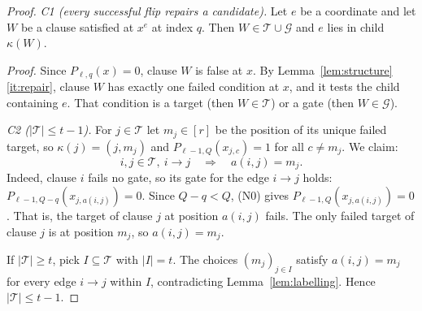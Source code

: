 \documentclass[11pt]{article}
\theoremstyle{definition}
\theoremstyle{remark}
\begin{document}
\begin{proof}
\smallskip\noindent\emph{C1 (every successful flip repairs a candidate).}
Let \(e\) be a coordinate and let \(W\) be a clause satisfied at \(x^e\) at
index \(q\). Then \(W\in\mathcal T\cup\mathcal G\) and \(e\) lies in child
\(\kappa(W)\).

\emph{Proof.} Since \(P_{\ell,q}(x)=0\), clause \(W\) is false at \(x\). By
Lemma~\ref{lem:structure}\ref{it:repair}, clause \(W\) has exactly one
failed condition at \(x\), and it tests the child containing \(e\). That
condition is a target (then \(W\in\mathcal T\)) or a gate (then
\(W\in\mathcal G\)).

\smallskip\noindent\emph{C2 (\(|\mathcal T|\le t-1\)).}
For \(j\in\mathcal T\) let \(m_j\in[r]\) be the position of its unique failed
target, so \(\kappa(j)=(j,m_j)\) and \(P_{\ell-1,Q}(x_{j,c})=1\) for all
\(c\ne m_j\). We claim:
\[
 i,j\in\mathcal T,\ i\to j\quad\Longrightarrow\quad a(i,j)=m_j .
\]
Indeed, clause \(i\) fails no gate, so its gate for the edge \(i\to j\)
holds: \(P_{\ell-1,Q-q}(x_{j,a(i,j)})=0\). Since \(Q-q<Q\), (N0) gives
\(P_{\ell-1,Q}(x_{j,a(i,j)})=0\). That is, the target of clause \(j\) at
position \(a(i,j)\) fails. The only failed target of clause \(j\) is at
position \(m_j\), so \(a(i,j)=m_j\).

If \(|\mathcal T|\ge t\), pick \(I\subseteq\mathcal T\) with \(|I|=t\). The
choices \((m_j)_{j\in I}\) satisfy \(a(i,j)=m_j\) for every edge \(i\to j\)
within \(I\), contradicting Lemma~\ref{lem:labelling}. Hence
\(|\mathcal T|\le t-1\).


\end{proof}
\end{document}
